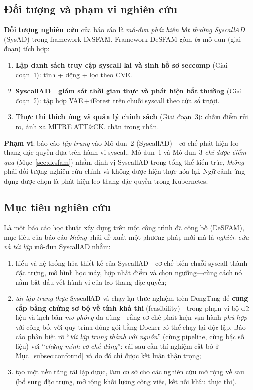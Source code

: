 \subsection{Đối tượng và phạm vi nghiên cứu}
\label{subsec:scope}
\textbf{Đối tượng nghiên cứu} của báo cáo là \emph{mô-đun phát hiện bất thường
SyscallAD} (SysAD) trong framework DeSFAM. Framework DeSFAM gồm \emph{ba} mô-đun
(giai đoạn) tích hợp:
\begin{enumerate}[label=\textbf{Mô-đun \arabic*.},leftmargin=2.6em]
  \item \textbf{Lập danh sách truy cập syscall lai và sinh hồ sơ seccomp} (Giai
        đoạn~1): tĩnh + động + lọc theo CVE.
  \item \textbf{SyscallAD---giám sát thời gian thực và phát hiện bất thường} (Giai
        đoạn~2): tập hợp VAE\,+\,iForest trên chuỗi syscall theo cửa sổ trượt.
  \item \textbf{Thực thi thích ứng và quản lý chính sách} (Giai đoạn~3): chấm điểm
        rủi ro, ánh xạ MITRE ATT\&CK, chặn trong nhân.
\end{enumerate}

\textbf{Phạm vi}: báo cáo \emph{tập trung} vào Mô-đun~2 (SyscallAD)---cơ chế phát
hiện leo thang đặc quyền dựa trên hành vi syscall. Mô-đun~1 và Mô-đun~3 \emph{chỉ
được điểm qua} (Mục~\ref{sec:desfam}) nhằm định vị SyscallAD trong tổng thể kiến
trúc, \emph{không} phải đối tượng nghiên cứu chính và không được hiện thực hóa lại.
Ngữ cảnh ứng dụng được chọn là phát hiện leo thang đặc quyền trong Kubernetes.

\subsection{Mục tiêu nghiên cứu}
Là một báo cáo học thuật xây dựng trên một công trình đã công bố (DeSFAM), mục tiêu
của báo cáo \emph{không} phải đề xuất một phương pháp mới mà là \emph{nghiên cứu và
tái lập} mô-đun SyscallAD nhằm:
\begin{enumerate}[label=(\roman*),leftmargin=2.0em]
  \item hiểu và hệ thống hóa thiết kế của SyscallAD---cơ chế biến chuỗi syscall
        thành đặc trưng, mô hình học máy, hợp nhất điểm và chọn ngưỡng---cùng cách nó
        nắm bắt dấu vết hành vi của leo thang đặc quyền;
  \item \emph{tái lập trung thực} SyscallAD và chạy lại thực nghiệm trên DongTing để
        \textbf{cung cấp bằng chứng sơ bộ về tính khả thi} (feasibility)---trong phạm
        vi bộ dữ liệu và kịch bản \emph{mô phỏng} đã dùng---rằng cơ chế phát hiện vận
        hành \emph{phù hợp} với công bố, với quy trình đóng gói bằng Docker có thể
        chạy lại độc lập. Báo cáo phân biệt rõ ``\emph{tái lập trung thành với nguồn}''
        (cùng pipeline, cùng bậc số liệu) với ``\emph{chứng minh cơ chế đúng}'': cái
        sau cần thí nghiệm cắt bỏ ở Mục~\ref{subsec:confound} và do đó chỉ được kết
        luận thận trọng;
  \item tạo một nền tảng tái lập được, làm cơ sở cho các nghiên cứu mở rộng về sau
        (bổ sung đặc trưng, mở rộng khối lượng công việc, kết nối khâu thực thi).
\end{enumerate}


